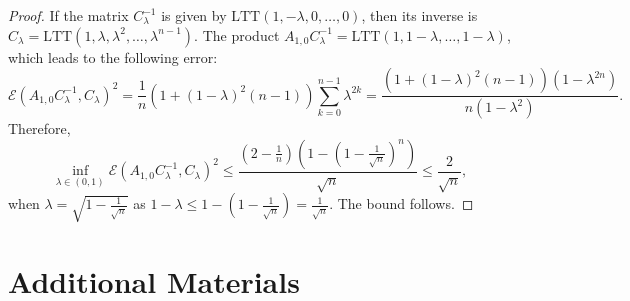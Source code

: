 \documentclass{article} %
\begin{document}
\begin{proof}
If the matrix $C_{\lambda}^{-1}$ is given by $\text{LTT}(1, -\lambda, 0, \dots, 0)$, then its inverse is $C_{\lambda} = \text{LTT}(1, \lambda, \lambda^{2}, \dots, \lambda^{n - 1})$. The product $A_{1, 0} C^{-1}_{\lambda} = \text{LTT}(1, 1 - \lambda, \dots, 1 - \lambda)$, which leads to the following error:
%
\begin{equation}
    \mathcal{E}(A_{1, 0} C^{-1}_{\lambda}, C_{\lambda})^2 = \frac{1}{n} \left(1 + (1 - \lambda)^2(n - 1)\right) \sum\limits_{k = 0}^{n - 1} \lambda^{2k} = \frac{(1 + (1 - \lambda)^2(n - 1))(1 - \lambda^{2n})}{n(1 - \lambda^2)}.
\end{equation}
Therefore,
\begin{equation}
    \inf_{\lambda \in (0,1)} \mathcal{E}(A_{1, 0} C^{-1}_{\lambda}, C_{\lambda})^2 \le  \frac{\left(2 - \frac{1}{n}\right) \left(1 - \left(1 - \frac{1}{\sqrt{n}}\right)^{n}\right)}{\sqrt{n}} \le \frac{2}{\sqrt{n}},
\end{equation}
when $\lambda =\sqrt{1 - \frac{1}{\sqrt{n}}}$ as $1 - \lambda \le 1 - (1 - \frac{1}{\sqrt{n}}) = \frac{1}{\sqrt{n}}$. The bound follows.
\end{proof}

\clearpage
\section{Additional Materials}
\end{document}
